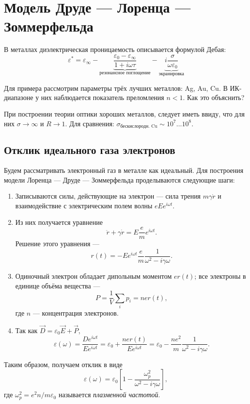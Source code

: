 \section{Модель Друде --- Лоренца --- Зоммерфельда}
В металлах диэлектрическая проницаемость описывается формулой Дебая:
\begin{equation}
  \varepsilon^{*} = \varepsilon_{\infty} 
-
\underbrace{
  \frac{\varepsilon_0 - \varepsilon_{\infty}}{1 + i\omega \tau}
}_{\text{резонансное поглощение}}
  -
\underbrace{
i\frac{\sigma}{\omega\varepsilon_0}
}_{\text{экранировка}}
\end{equation}

Для примера рассмотрим параметры трёх лучших металлов: Ag, Au, Cu.
В ИК-диапазоне у них наблюдается показатель преломления \(n < 1\).
Как это объяснить?

При построении теории оптики хороших металлов, следует иметь ввиду, что для
них \(\sigma \to \infty\) и \(R \to 1\). Для сравнения:
\(\sigma_{\text{бескислородн. Cu}} \sim 10^7\ldots10^8\).

\subsection{Отклик идеального газа электронов}
Будем рассматривать электронный газ в металле как идеальный.
Для построения модели Лоренца --- Друде --- Зоммерфельда проделываются следующие
шаги:
\begin{enumerate}
\item
Записываются силы, действующие на электрон --- сила трения \(m\gamma\dot{r}\)
и взаимодействие с электрическим полем волны \(eEe^{i\omega t}\).
\item
Из них получается уравнение 
\begin{equation}
  \ddot{r} + \gamma\dot{r} = E\frac{e}{m} e^{i\omega t}.
\end{equation}
Решение этого уравнения ---
\begin{equation}
  r(t) = -Ee^{i\omega t} \frac{e}{m} \frac{1}{\omega^2 - i\gamma\omega}.
\end{equation}
\item
Одиночный электрон обладает дипольным моментом \(e r(t)\); все электроны
в единице объёма вещества ---
\begin{equation}
  P = \frac{1}{V} \sum_i p_i = ner(t),
\end{equation}
где \(n\) --- концентрация электронов.
\item
Так как \(\vec{D} = \varepsilon_0 \vec{E} + \vec{P}\), 
\begin{equation}
  \varepsilon(\omega) = \frac{De^{i\omega t}}{Ee^{i\omega t}} = \varepsilon_0 + \frac{ner(t)}{Ee^{i\omega t}}
  =
  \varepsilon_0 - \frac{ne^2}{m}\frac{1}{\omega^2 - i\gamma\omega}.
\end{equation}
\end{enumerate}
Таким образом, получаем отклик в виде 
\begin{equation}
  \varepsilon(\omega) = \varepsilon_0 \left[1 - \frac{\omega_p^2}{\omega^2
  - i\gamma\omega}\right],
\end{equation}
где \(\omega^2_p = e^2n/m\varepsilon_0\) называется \emph{плазменной частотой}.

